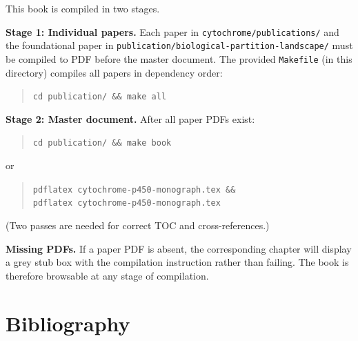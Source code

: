 \documentclass[11pt,a4paper,openany,twoside]{book}
\theoremstyle{definition}
\theoremstyle{remark}
\begin{document}
\noindent This book is compiled in two stages.

\medskip
\noindent\textbf{Stage 1: Individual papers.}
Each paper in \texttt{cytochrome/publications/} and the foundational paper in
\texttt{publication/biological-partition-landscape/} must be compiled to PDF
before the master document.  The provided \texttt{Makefile} (in this directory)
compiles all papers in dependency order:
\begin{quote}
\texttt{cd publication/ \&\& make all}
\end{quote}

\noindent\textbf{Stage 2: Master document.}
After all paper PDFs exist:
\begin{quote}
\texttt{cd publication/ \&\& make book}
\end{quote}
or
\begin{quote}
\texttt{pdflatex cytochrome-p450-monograph.tex \&\& \\
pdflatex cytochrome-p450-monograph.tex}
\end{quote}
(Two passes are needed for correct TOC and cross-references.)

\medskip
\noindent\textbf{Missing PDFs.}
If a paper PDF is absent, the corresponding chapter will display a grey stub
box with the compilation instruction rather than failing.  The book is
therefore browsable at any stage of compilation.

\chapter*{Bibliography}
\end{document}
